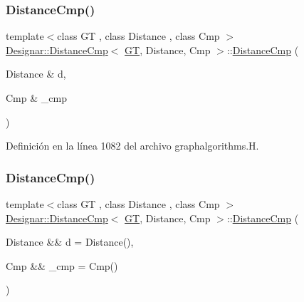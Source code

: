 \subsubsection{\texorpdfstring{Distance\+Cmp()}{DistanceCmp()}\hspace{0.1cm}{\footnotesize\ttfamily [1/2]}}
{\footnotesize\ttfamily template$<$class GT , class Distance , class Cmp $>$ \\
\hyperlink{class_designar_1_1_distance_cmp}{Designar\+::\+Distance\+Cmp}$<$ \hyperlink{demo-buildgraph_8_c_a3001c40d2c31ca87ed96cd7d1334a55e}{GT}, Distance, Cmp $>$\+::\hyperlink{class_designar_1_1_distance_cmp}{Distance\+Cmp} (\begin{DoxyParamCaption}\item[{Distance \&}]{d,  }\item[{Cmp \&}]{\+\_\+cmp }\end{DoxyParamCaption})\hspace{0.3cm}{\ttfamily [inline]}}



Definición en la línea 1082 del archivo graphalgorithms.\+H.

\mbox{\label{class_designar_1_1_distance_cmp_a1b9bedd922fc3007038b63fe19bfd10e}} 
\subsubsection{\texorpdfstring{Distance\+Cmp()}{DistanceCmp()}\hspace{0.1cm}{\footnotesize\ttfamily [2/2]}}
{\footnotesize\ttfamily template$<$class GT , class Distance , class Cmp $>$ \\
\hyperlink{class_designar_1_1_distance_cmp}{Designar\+::\+Distance\+Cmp}$<$ \hyperlink{demo-buildgraph_8_c_a3001c40d2c31ca87ed96cd7d1334a55e}{GT}, Distance, Cmp $>$\+::\hyperlink{class_designar_1_1_distance_cmp}{Distance\+Cmp} (\begin{DoxyParamCaption}\item[{Distance \&\&}]{d = {\ttfamily Distance()},  }\item[{Cmp \&\&}]{\+\_\+cmp = {\ttfamily Cmp()} }\end{DoxyParamCaption})\hspace{0.3cm}{\ttfamily [inline]}}




